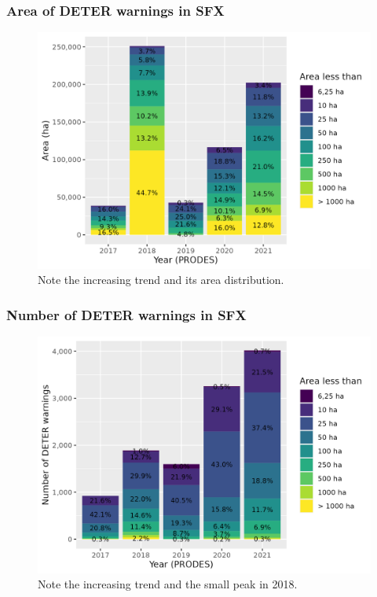 \documentclass[aspectratio=169]{beamer}
\begin{document}
\begin{frame}
    \frametitle{Area of DETER warnings in SFX}
    \begin{figure}[h] 
        \includegraphics[width=0.65\linewidth]
        {./figures/deter_warnings_area_size.png}
        \caption{Note the increasing trend and its area distribution.}
        \label{fig:deter_warnings_area}
    \end{figure}
\end{frame}

\begin{frame}
    \frametitle{Number of DETER warnings in SFX}
    \begin{figure}[h] 
        \includegraphics[width=0.65\linewidth]
        {./figures/deter_warnings_size.png}
        \caption{Note the increasing trend and the small peak in 2018.}
        \label{fig:deter_warnings_number}
    \end{figure}
\end{frame}
\end{document}
